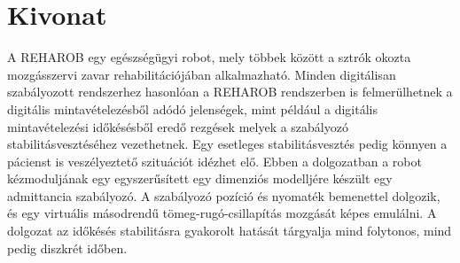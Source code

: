 \cleardoublepage{}
\chapter*{Kivonat}

A REHAROB egy egészségügyi robot, mely többek között a sztrók okozta mozgásszervi 
zavar rehabilitációjában alkalmazható. 
%
Minden digitálisan szabályozott rendszerhez hasonlóan a REHAROB rendszerben is felmerülhetnek a 
digitális mintavételezésből adódó jelenségek, mint például a digitális mintavételezési időkésésből 
eredő rezgések melyek a szabályozó stabilitásvesztéséhez vezethetnek. 
%
Egy esetleges stabilitásvesztés pedig könnyen a pácienst is veszélyeztető szituációt idézhet elő. %
%
Ebben a dolgozatban a robot kézmoduljának egy egyszerűsített egy dimenziós modelljére készült egy 
admittancia szabályozó. 
%
A szabályozó pozíció és nyomaték bemenettel 
dolgozik, és egy virtuális másodrendű tömeg-rugó-csillapítás mozgását képes emulálni. 
%
A dolgozat az időkésés stabilitásra gyakorolt hatását tárgyalja mind
folytonos, mind pedig diszkrét időben. 